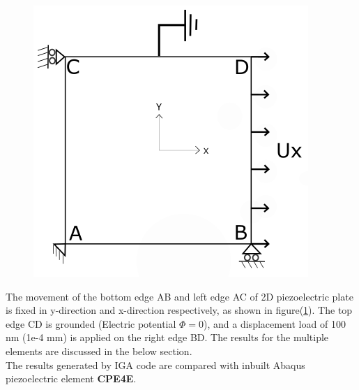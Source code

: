 \documentclass[12pt]{article}
\begin{document}
\begin{figure}[H]
\begin{minipage}{.5\textwidth}
		\includegraphics[width=1\linewidth]{Grounded.png}
		\label{EMLoading}
	\end{minipage}
\end{figure}
The movement of the bottom edge AB and left edge AC of 2D piezoelectric plate is fixed in y-direction and x-direction respectively, as shown in figure(\ref{EMLoading}).
The top edge CD is grounded (Electric potential $\Phi = 0$), and a displacement load of 100 nm (1e-4 mm) is applied on the right edge BD. The results for the multiple elements are discussed in the below
section. \\
The results generated by IGA code are compared with inbuilt Abaqus piezoelectric
element \textbf{CPE4E}.

\newpage
\end{document}
